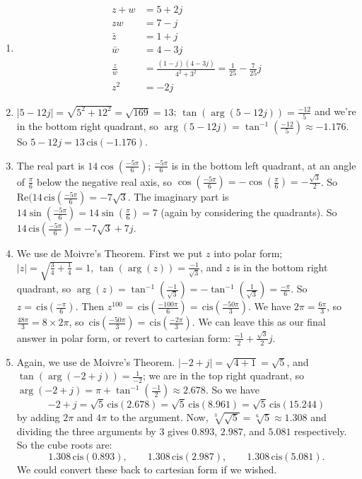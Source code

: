 \documentclass{article}
\newcommand{\cis}{\,\mathrm{cis}}
\begin{document}
\begin{enumerate}
\item 
	\begin{align*}
		z+w &= 5+2j\\
		zw&= 7-j\\
		\bar{z}&=1+j\\
		\bar{w}&=4-3j\\
		\frac{z}{w}&=\frac{(1-j)(4-3j)}{4^2+3^2}=\frac{1}{25} -\frac{7}{25}j\\
		z^2 &= -2j
	\end{align*}
\item $|5-12j| = \sqrt{5^2+12^2} = \sqrt{169} = 13$; $\tan(\arg(5-12j))=\frac{-12}{5}$ and we're in the bottom right quadrant, so $\arg(5-12j) = \tan^{-1}\left(\frac{-12}{5}\right)\approx -1.176$. So $5-12j=13\cis(-1.176)$.

\item The real part is $14\cos\left(\frac{-5\pi}{6}\right)$; $\frac{-5\pi}{6}$ is in the bottom left quadrant, at an angle of $\frac{\pi}{6}$ below the negative real axis, so $\cos\left(\frac{-5\pi}{6}\right)=-\cos\left(\frac{\pi}{6}\right)=-\frac{\sqrt{3}}{2}$. So $\mathrm{Re}(14\cis\left(\frac{-5\pi}{6}\right)=-7\sqrt{3}$. The imaginary part is $14\sin\left(\frac{-5\pi}{6}\right)=14\sin\left(\frac{\pi}{6}\right) = 7$ (again by considering the quadrants). So $14\cis\left(\frac{-5\pi}{6}\right) = -7\sqrt{3}+7j$.

\item We use de Moivre's Theorem. First we put $z$ into polar form; $|z|=\sqrt{\frac{3}{4}+\frac{1}{4}}=1$, $\tan(\arg(z))=\frac{-1}{\sqrt{3}}$, and $z$ is in the bottom right quadrant, so $\arg(z)=\tan^{-1}\left(\frac{-1}{\sqrt{3}}\right)=-\tan^{-1}\left(\frac{1}{\sqrt{3}}\right)=\frac{-\pi}{6}$. So $z=\cis\left(\frac{-\pi}{6}\right)$. Then $z^{100}=\cis\left(\frac{-100\pi}{6}\right)=\cis\left(\frac{-50\pi}{3}\right)$. We have $2\pi=\frac{6\pi}{3}$, so $\frac{48\pi}{3}=8\times 2\pi$, so $\cis\left(\frac{-50\pi}{3}\right)=\cis\left(\frac{-2\pi}{3}\right)$. We can leave this as our final answer in polar form, or revert to cartesian form: $\frac{-1}{2}+\frac{\sqrt{3}}{2}j$.

\item Again, we use de Moivre's Theorem. $|-2+j|=\sqrt{4+1}=\sqrt{5}$, and $\tan(\arg(-2+j))=\frac{1}{-2}$; we are in the top right quadrant, so $\arg(-2+j)=\pi+\tan^{-1}\left(\frac{-1}{2}\right)\approx 2.678$. So we have
\[-2+j = \sqrt{5}\cis(2.678) = \sqrt{5}\cis(8.961) = \sqrt{5}\cis(15.244)\]
by adding $2\pi$ and $4\pi$ to the argument. Now, $\sqrt[3]{\sqrt{5}}=\sqrt[6]{5}\approx 1.308$ and dividing the three arguments by 3 gives $0.893$, $2.987$, and $5.081$ respectively. So the cube roots are:
\[1.308\cis(0.893),\qquad 1.308\cis(2.987),\qquad 1.308\cis(5.081).\]
We could convert these back to cartesian form if we wished.
\end{enumerate}
\end{document}

